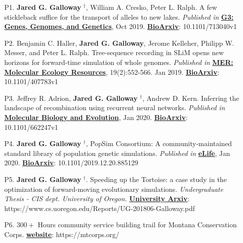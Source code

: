 \documentclass[letterpaper,11pt]{article}
\let\oldhref\href
\renewcommand{\href}[2]{\oldhref{#1}{\bfseries#2}}
\begin{document}
\begin{enumerate}
\item [P1.] \textbf{Jared G. Galloway} $^{\dagger}$, William A. Cresko, Peter L. Ralph. A few stickleback suffice for the transport
of alleles to new lakes. 
\textit{Published in} 
\href{https://www.g3journal.org/content/early/2019/12/04/g3.119.400564}{G3: Genes, Genomes, and Genetics}, Oct 2019.
\href{https://www.biorxiv.org/content/10.1101/713040v1.abstract}{BioArxiv}: 10.1101/713040v1

\item [P2.] Benjamin C. Haller, \textbf{Jared G. Galloway}, Jerome Kelleher, Philipp W. Messer, and Peter L. Ralph.
Tree-sequence recording in SLiM opens new horizons for forward-time simulation of whole genomes. 
\textit{Published in} 
\href{https://onlinelibrary.wiley.com/doi/abs/10.1111/1755-0998.12968}{MER: Molecular Ecology Resources}, 19(2):552-566. Jan 2019. 
\href{https://www.biorxiv.org/content/10.1101/407783v1}{BioArxiv}: 10.1101/407783v1 

\item [P3.] Jeffrey R. Adrion, \textbf{Jared G. Galloway} $^{\dagger}$, Andrew D. Kern. Inferring the landscape of recombination 
using recurrent neural networks. 
\textit{Published in} 
\href{https://academic.oup.com/mbe}{Molecular Biology and Evolution}, Jan 2020.
\href{https://www.biorxiv.org/content/10.1101/662247v1.abstract}{BioArxiv}: 10.1101/662247v1

\item [P4.] \textbf{Jared G. Galloway} $^{\dagger}$, PopSim Consortium:
A community-maintained standard library of population genetic simulations.
\textit{Published in}
\href{https://elifesciences.org/?gclid=CjwKCAiA6vXwBRBKEiwAYE7iS0LA_KboY5NjoOVJAMq06BEUSsqPFV9R1GA1NUUIgYw2XgTiv1fUxhoC3xYQAvD_BwE}{eLife}, Jan 2020.
\href{https://www.biorxiv.org/content/10.1101/2019.12.20.885129v1}{BioArxiv}: 10.1101/2019.12.20.885129 

\item [P5.] \textbf{Jared G. Galloway} $^{\dagger}$. Speeding up the Tortoise: a case study in the optimization of forward-moving
evolutionary simulations. \textit{Undergraduate Thesis - CIS dept. University of Oregon.} 
\href{https://www.cs.uoregon.edu/Reports/UG-201806-Galloway.pdf}{University Arxiv}: https://www.cs.uoregon.edu/Reports/UG-201806-Galloway.pdf

\item [P6.] $300+$ Hours community service building trail for Montana Conservation Corps. 
\href{https://mtcorps.org/}{website}: https://mtcorps.org/



\end{enumerate}
\end{document}
